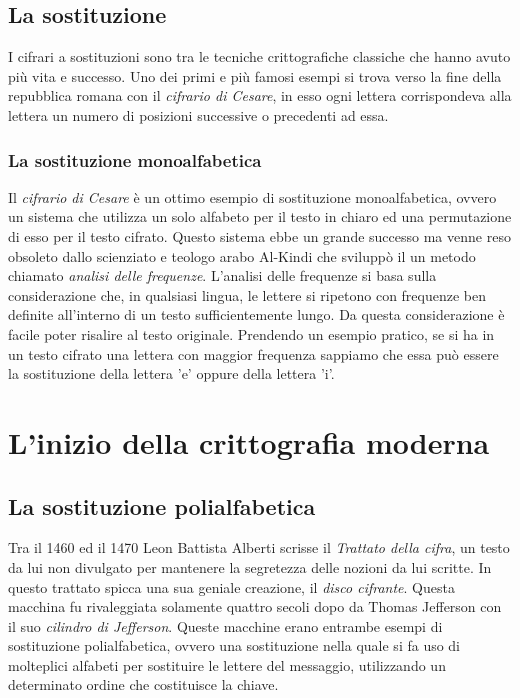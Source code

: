 \documentclass[a4paper, 12pt]{article}
\begin{document}
\subsection{La sostituzione}
I cifrari a sostituzioni sono tra le tecniche crittografiche classiche che hanno avuto più vita e successo. Uno dei primi e più famosi esempi si trova verso la fine della repubblica romana con il \textit{cifrario di Cesare}, in esso ogni lettera corrispondeva alla lettera un numero di posizioni successive o precedenti ad essa. 
\subsubsection{La sostituzione monoalfabetica}
Il \textit{cifrario di Cesare} è un ottimo esempio di sostituzione monoalfabetica, ovvero un sistema che utilizza un solo alfabeto per il testo in chiaro ed una permutazione di esso per il testo cifrato.\newline
Questo sistema ebbe un grande successo ma venne reso obsoleto dallo scienziato e teologo arabo Al-Kindi che sviluppò il un metodo chiamato \textit{analisi delle frequenze}.\newline
L'analisi delle frequenze si basa sulla considerazione che, in qualsiasi lingua, le lettere si ripetono con frequenze ben definite all'interno di un testo sufficientemente lungo. Da questa considerazione è facile poter risalire al testo originale. Prendendo un esempio pratico, se si ha in un testo cifrato una lettera con maggior frequenza sappiamo che essa può essere la sostituzione della lettera 'e' oppure della lettera 'i'.
\section{L'inizio della crittografia moderna}
\subsection{La sostituzione polialfabetica}
Tra il 1460 ed il 1470 Leon Battista Alberti scrisse il \textit{Trattato della cifra}, un testo da lui non divulgato per mantenere la segretezza delle nozioni da lui scritte. In questo trattato spicca una sua geniale creazione, il \textit{disco cifrante}. Questa macchina fu rivaleggiata solamente quattro secoli dopo da Thomas Jefferson con il suo \textit{cilindro di Jefferson}.
Queste macchine erano entrambe esempi di sostituzione polialfabetica, ovvero una sostituzione nella quale si fa uso di molteplici alfabeti per sostituire le lettere del messaggio, utilizzando un determinato ordine che costituisce la chiave.
\end{document}
